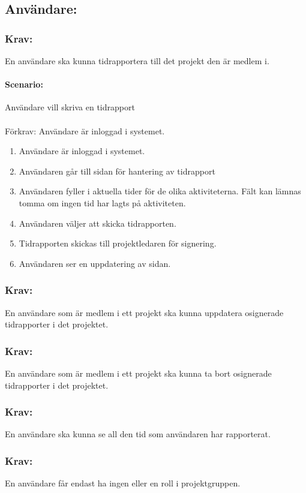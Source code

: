 \documentclass[paper=a4, fontsize=11pt,twoside]{article}
\begin{document}
\subsection{Användare:}
 \subsubsection{Krav:} En användare ska kunna tidrapportera till det projekt den är medlem i.
 \paragraph{Scenario:} Användare vill skriva en tidrapport
  \paragraph{ }
  Förkrav: Användare är inloggad i systemet.
 
 \begin{enumerate}
\item	Användare är inloggad i systemet.
\item 	Användaren går till sidan för hantering av tidrapport
\item 	Användaren fyller i aktuella tider för de olika aktiviteterna. Fält kan lämnas tomma om ingen tid har lagts på aktiviteten.
\item	Användaren väljer att skicka tidrapporten.
\item 	Tidrapporten skickas till projektledaren för signering.
 \item Användaren ser en uppdatering av sidan.
 	
 	
 \end{enumerate}
 
 \subsubsection{Krav:} En användare som är medlem i ett projekt ska kunna uppdatera osignerade tidrapporter i det projektet.
 \subsubsection{Krav:} En användare som är medlem i ett projekt ska kunna ta bort osignerade tidrapporter i det projektet.
\subsubsection{Krav:}En användare ska kunna se all den tid som användaren har rapporterat.
\subsubsection{Krav:}En användare får endast ha ingen eller en roll i projektgruppen.
\end{document}
